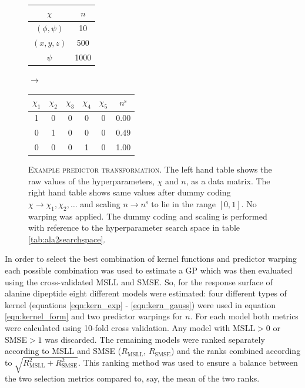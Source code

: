 \begin{figure}
    \centering
    \begin{tabular}{cc}
        \toprule
        $\chi$    &  $n$ \\
        \midrule
        $(\phi, \psi)$    &  10 \\
        $(x, y, z)$ & 500 \\
        $\psi$  & 1000 \\
        \bottomrule
        \end{tabular}
    $\longrightarrow $
    \begin{tabular}{cccccc}
        \toprule
        $\chi_{1}$ &$\chi_{2}$ &$\chi_{3}$ &$\chi_{4}$ &$\chi_{5}$ &  $n^{\mathrm{s}}$ \\
        \midrule
        1 & 0 & 0 & 0 & 0  &  \num{0.00} \\
        0 & 1 & 0 & 0 & 0  &  \num{0.49} \\
        0 & 0 & 0 & 1 & 0  &  \num{1.00} \\
        \bottomrule
    \end{tabular} 
    \caption[Example predictor transformation]{\textsc{Example predictor transformation}. The left hand table shows the raw values of the hyperparameters, $\chi$ and $n$, as a data matrix. The right hand table shows same values after dummy coding $\chi \rightarrow \chi_{1}, \chi_{2}, \ldots$ and scaling $n\rightarrow n^{\mathrm{s}}$ to lie in the range $[0, 1]$. No warping was applied. The dummy coding and scaling is performed with reference to the hyperparameter search space in table \ref{tab:ala2searchspace}.}
    \label{fig:msm_eg_transform}
\end{figure}

In order to select the best combination of kernel functions and predictor warping each possible combination was used to estimate a GP which was then evaluated using the cross-validated MSLL and SMSE. So, for the response surface of alanine dipeptide eight different models were estimated: four different types of kernel (equations \ref{eqn:kern_exp} - \ref{eqn:kern_gauss}) were used in equation \ref{eqn:kernel_form} and two predictor warpings for $n$. For each model both metrics were calculated using 10-fold cross validation. Any model with MSLL$ > 0$ or SMSE$ > 1$ was discarded. The remaining models were ranked separately according to MSLL and SMSE ($R_{\mathrm{MSLL}}$, $R_{\mathrm{SMSE}}$) and the ranks combined according to $\sqrt{R_{\mathrm{MSLL}}^2 + R_{\mathrm{SMSE}}^2}$. This ranking method was used to ensure a balance between the two selection metrics compared to, say, the mean of the two ranks.  

